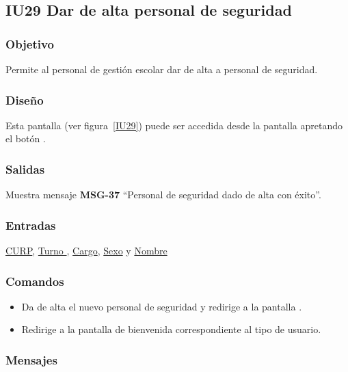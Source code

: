 
\subsection{IU29 Dar de alta personal de seguridad}
\subsubsection{Objetivo}
    Permite al personal de gestión escolar dar de alta a personal de seguridad.
\subsubsection{Diseño}
    Esta pantalla  (ver figura~\ref{IU29}) puede ser accedida desde la pantalla  apretando el botón .

\subsubsection{Salidas}
Muestra mensaje {\bf MSG-37} ``Personal de seguridad dado de alta con éxito''.
\subsubsection{Entradas}
\hyperlink{Personal-de-seguridad.CURP }{CURP}, \hyperlink{personal-de-seguridad.Turno }{Turno }, \hyperlink{ Personal-de-seguridad.Cargo }{Cargo}, \hyperlink{ Personal-de-seguridad.Sexo}{Sexo} y \hyperlink{ Personal-de-seguridad.Nombre}{Nombre} 
\subsubsection{Comandos}
\begin{itemize}
    \item {} Da de alta el nuevo personal de seguridad y redirige a la pantalla .
    \item {} Redirige a la pantalla de bienvenida correspondiente al tipo de usuario.
    
\end{itemize}

\subsubsection{Mensajes}

